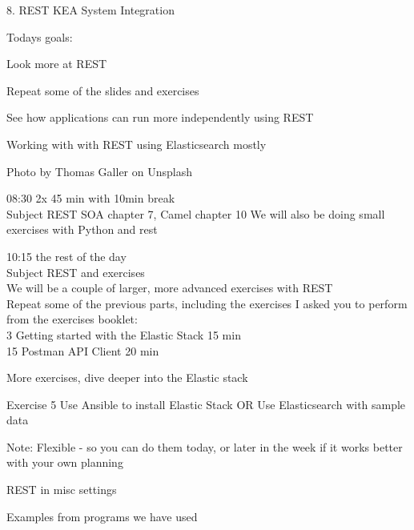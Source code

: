 \documentclass[Screen16to9,17pt]{foils}
\begin{document}
\mytitlepage
{8. REST}
{KEA System Integration}




Todays goals:
\begin{list2}
\item Look more at REST
\item Repeat some of the slides and exercises
\item See how applications can run more independently using REST
\item Working with with REST using Elasticsearch mostly
\end{list2}

Photo by Thomas Galler on Unsplash


\begin{list2}
\item 08:30 2x 45 min with 10min break\\
Subject REST
SOA chapter 7, Camel chapter 10
We will also be doing small exercises with Python and rest

\item 10:15  the rest of the day\\
Subject REST and exercises\\
We will be a couple of larger, more advanced exercises with REST\\

Repeat some of the previous parts, including the exercises I asked you to perform from the exercises booklet:\\
3 Getting started with the Elastic Stack 15 min\\
15 Postman API Client 20 min

More exercises, dive deeper into the Elastic stack

Exercise 5 Use Ansible to install Elastic Stack
OR
Use Elasticsearch with sample data

Note: Flexible - so you can do them today, or later in the week if it works better with your own planning
\end{list2}



\begin{list2}
\item REST in misc settings
\item Examples from programs we have used
\end{list2}
\end{document}
